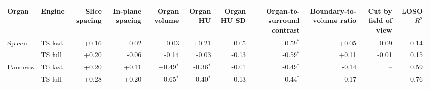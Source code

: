 \begin{tabular}{llrrrrrrrrr}
\toprule
Organ & Engine & Slice spacing & In-plane spacing & Organ volume & Organ HU & Organ HU SD & Organ-to-surround contrast & Boundary-to-volume ratio & Cut by field of view & LOSO $R^2$ \\
\midrule
Spleen & TS fast & +0.16 & -0.02 & -0.03 & +0.21 & -0.05 & -0.59$^*$ & +0.05 & -0.09 & 0.14 \\
 & TS full & +0.20 & -0.06 & -0.14 & -0.03 & -0.13 & -0.59$^*$ & +0.11 & -0.01 & 0.15 \\
Pancreas & TS fast & +0.20 & +0.11 & +0.49$^*$ & -0.36$^*$ & -0.01 & -0.49$^*$ & -0.14 & -- & 0.59 \\
 & TS full & +0.28 & +0.20 & +0.65$^*$ & -0.40$^*$ & +0.13 & -0.44$^*$ & -0.17 & -- & 0.76 \\
\bottomrule
\end{tabular}
